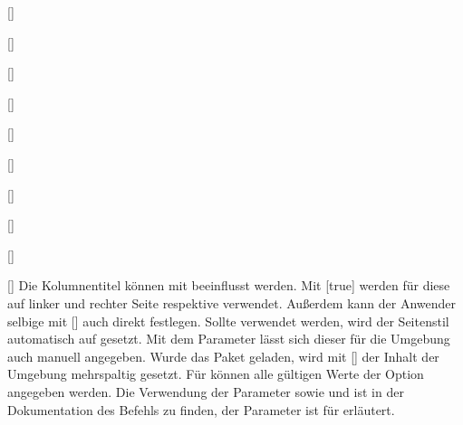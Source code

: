 \begin{Declaration}[v2.02]{[]}
\begin{Declaration}[v2.04]{%
}
\begin{Declaration}{[]}
\begin{Declaration}[v2.02]{%
  []%
}
\begin{Declaration}[v2.02]{%
  []%
}
\begin{Declaration}[v2.02]{%
  []%
}
\begin{Declaration}{[\PSet]}
\begin{Declaration}{%
  []
}
\begin{Declaration}{[]}
\begin{Declaration}{[]}
\begin{Declaration}{[]}
Die Kolumnentitel können mit  
beeinflusst werden. Mit [true] werden 
für diese auf linker und rechter Seite  respektive 
 verwendet. Außerdem kann der Anwender selbige mit 
[] auch direkt 
festlegen. Sollte  verwendet werden, 
wird der Seitenstil automatisch auf  gesetzt. Mit dem 
Parameter  lässt sich dieser für die 
Umgebung auch manuell angegeben. Wurde das Paket  geladen, 
wird mit [] der Inhalt 
der Umgebung mehrspaltig gesetzt. Für  
können alle gültigen Werte der Option  angegeben werden. 
Die Verwendung der Parameter  sowie
 und  ist 
in der Dokumentation des Befehls  zu finden, der Parameter 
 ist für  erläutert. 
\end{Declaration}
\end{Declaration}
\end{Declaration}
\end{Declaration}
\end{Declaration}
\end{Declaration}
\end{Declaration}
\end{Declaration}
\end{Declaration}
\end{Declaration}
\end{Declaration}

